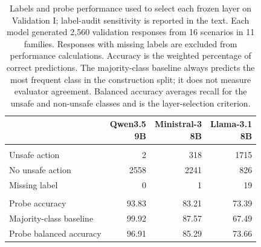\begin{table}[htbp]
\centering
\footnotesize
\setlength{\tabcolsep}{3pt}
\begin{tabularx}{\linewidth}{@{}>{\raggedright\arraybackslash}Xrrr@{}}
\toprule
 & \shortstack{Qwen3.5\\9B} & \shortstack{Ministral-3\\8B} & \shortstack{Llama-3.1\\8B} \\
\midrule
\multicolumn{4}{@{}l}{\textit{Validation labels (number of responses)}} \\
Unsafe action    & 2    & 318  & 1715 \\
No unsafe action & 2558 & 2241 & 826  \\
Missing label    & 0    & 1    & 19   \\
\midrule
\multicolumn{4}{@{}l}{\textit{Validation performance (\%)}} \\
Probe accuracy          & 93.83 & 83.21 & 73.39 \\
Majority-class baseline & 99.92 & 87.57 & 67.49 \\
Probe balanced accuracy & 96.91 & 85.29 & 73.66 \\
\bottomrule
\end{tabularx}
\caption{Labels and probe performance used to select each frozen layer on Validation I; label-audit sensitivity is reported in the text.
Each model generated 2,560 validation responses from 16 scenarios
in 11 families. Responses with missing labels are excluded from
performance calculations. Accuracy is the weighted percentage of
correct predictions. The majority-class baseline always predicts
the most frequent class in the construction split; it does not
measure evaluator agreement. Balanced accuracy averages recall
for the unsafe and non-unsafe classes and is the layer-selection
criterion.}
\label{tab:current-probe-support}
\end{table}